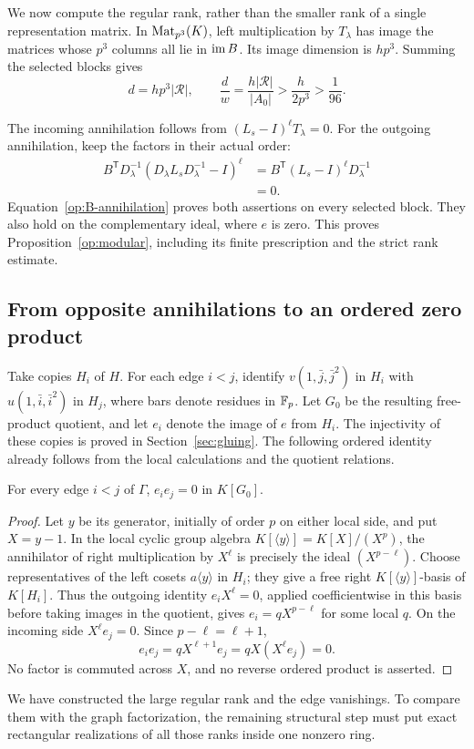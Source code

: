We now compute the regular rank, rather than the smaller rank of a
single representation matrix. In $\operatorname{Mat}_{p^3}(K)$, left multiplication
by $T_\lambda$ has image the matrices whose $p^3$ columns all lie in
$\operatorname{im} B$. Its image dimension is $hp^3$. Summing the selected blocks gives
\begin{equation}\label{op:regular-rank}
 d=hp^3|\mathscr R|,\qquad
 \frac d w=\frac{h|\mathscr R|}{|A_0|}
 >\frac{h}{2p^3}>\frac1{96}.
\end{equation}

The incoming annihilation follows from
$(L_s-I)^\ell T_\lambda=0$. For the outgoing annihilation, keep the
factors in their actual order:
\[
 \begin{split}
 B^{\mathsf T}D_\lambda^{-1}
     (D_\lambda L_sD_\lambda^{-1}-I)^\ell
 &=B^{\mathsf T}(L_s-I)^\ell D_\lambda^{-1}\\
 &=0.
 \end{split}
\]
Equation~\eqref{op:B-annihilation} proves both assertions on every
selected block. They also hold on the complementary ideal, where $e$
is zero. This proves Proposition~\ref{op:modular}, including its finite
prescription and the strict rank estimate.

\subsection{From opposite annihilations to an ordered zero product}

Take copies $H_i$ of $H$. For each edge $i<j$, identify
$v(1,\bar j,\bar j^2)$ in $H_i$ with $u(1,\bar i,\bar i^2)$ in $H_j$,
where bars denote residues in $\mathbb F_p$. Let $G_0$ be the resulting
free-product quotient, and let $e_i$ denote the image of $e$ from $H_i$.
The injectivity of these copies is proved in Section~\ref{sec:gluing}.
The following ordered identity
already follows from the local calculations and the quotient relations.

\begin{corollary}\label{op:edge-zero}
For every edge $i<j$ of $\Gamma$, $e_i e_j=0$ in $K[G_0]$.
\end{corollary}
\begin{proof}
Let $y$ be its generator, initially of order $p$ on either local side,
and put $X=y-1$. In the local cyclic group algebra
$K[\langle y\rangle]=K[X]/(X^p)$, the annihilator of right multiplication
by $X^\ell$ is precisely the ideal $(X^{p-\ell})$. Choose representatives
of the left cosets $a\langle y\rangle$ in $H_i$; they give a free right
$K[\langle y\rangle]$-basis of $K[H_i]$. Thus the outgoing identity
$e_iX^\ell=0$, applied coefficientwise in this basis before taking
images in the quotient, gives $e_i=qX^{p-\ell}$ for some local $q$.
On the incoming side $X^\ell e_j=0$. Since $p-\ell=\ell+1$,
\[
 e_i e_j=qX^{\ell+1}e_j=qX(X^\ell e_j)=0.
\]
No factor is commuted across $X$, and no reverse ordered product is
asserted.
\end{proof}

We have constructed the large regular rank and the edge vanishings.
To compare them with the graph factorization, the remaining structural
step must put exact rectangular realizations of all those ranks inside
one nonzero ring.
